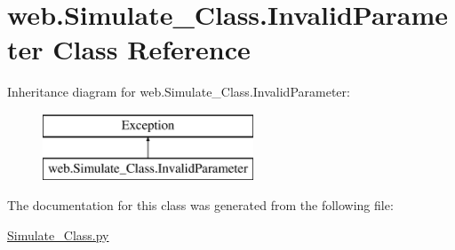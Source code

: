 \hypertarget{classweb_1_1_simulate___class_1_1_invalid_parameter}{\section{web.\-Simulate\-\_\-\-Class.\-Invalid\-Parameter Class Reference}
\label{classweb_1_1_simulate___class_1_1_invalid_parameter}
}
Inheritance diagram for web.\-Simulate\-\_\-\-Class.\-Invalid\-Parameter\-:\begin{figure}[H]
\begin{center}
\leavevmode
\includegraphics[height=2.000000cm]{classweb_1_1_simulate___class_1_1_invalid_parameter}
\end{center}
\end{figure}


The documentation for this class was generated from the following file\-:\begin{DoxyCompactItemize}
\item 
\hyperlink{_simulate___class_8py}{Simulate\-\_\-\-Class.\-py}\end{DoxyCompactItemize}
